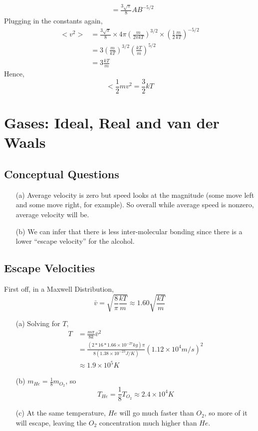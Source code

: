 \documentclass{article}
\begin{document}
\begin{itemize}
\begin{align*}
	&= \frac{3\sqrt{\pi}}{8}AB^{-5/2}
	\end{align*}
	Plugging in the constants again,
	\begin{align*}
	<v^2> &= \frac{3\sqrt{\pi}}{8}\times 4\pi\left(\frac{m}{2\pi kT}\right)^{3/2}\times \left(\frac{1}{2}\frac{m}{kT}\right)^{-5/2} \\
	&= 3\left(\frac{m}{kT}\right)^{3/2}\left(\frac{kT}{m}\right)^{5/2} \\
	&= 3\frac{kT}{m}
	\end{align*}
	Hence,
	\begin{equation}
	<\frac{1}{2}mv^2 = \frac{3}{2}kT
	\end{equation}
\end{itemize}

\newpage

\section{Gases: Ideal, Real and van der Waals}

\subsection{Conceptual Questions}

\begin{itemize}
	\item[(a)] Average velocity is zero but speed looks at the magnitude (some move left and some move right, for example). So overall while average speed is nonzero, average velocity will be.
	\item[(b)] We can infer that there is less inter-molecular bonding since there is a lower ``escape velocity'' for the alcohol.
\end{itemize}

\subsection{Escape Velocities}

First off, in a Maxwell Distribution,
\begin{equation}
\bar{v}=\sqrt{\frac{8}{\pi}\frac{kT}{m}} \approx 1.60\sqrt{\frac{kT}{m}}
\end{equation}
\begin{itemize}
	\item[(a)] Solving for $T$,
	\begin{align*}
	T &= \frac{m\pi}{8k}\bar{v}^2 \\
	&= \frac{(2*16*1.66\times10^{-27} kg)\pi}{8(1.38\times10^{-23} J/K)}(1.12\times 10^4 m/s)^2 \\
	&\approx 1.9\times10^5 K
	\end{align*}
	\item[(b)] $m_{He} = \frac{1}{8}m_{O_2}$, so
	\begin{equation}
	T_{He} = \frac{1}{8}T_{O_2}\approx2.4\times10^4 K
	\end{equation}
	\item[(c)] At the same temperature, $He$ will go much faster than $O_2$, so more of it will escape, leaving the $O_2$ concentration much higher than $He$.
\end{itemize}
\end{document}
